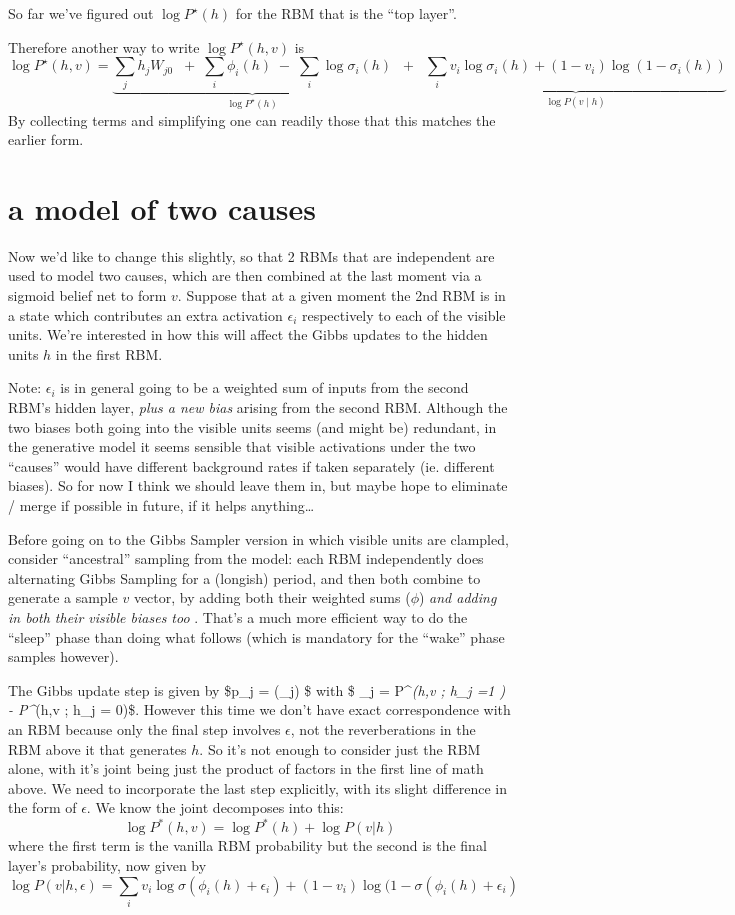 \documentclass{article}
\begin{document}
    So far we've figured out \(\log P^\star(h)\) for the RBM that is the
``top layer''.

Therefore another way to write \(\log P^\star(h,v)\) is \[ 
\log P^\star(h,v) = \underbrace{\sum_j h_j  W_{j0} \;\; + \; \sum_i \phi_i(h) \;  - \; \sum_i \log \sigma_i(h)}_{\log P^\star(h)} \;\;+\;\; \underbrace{\sum_i v_i \log \sigma_i(h) + (1-v_i) \log (1 - \sigma_i(h))}_{\log P(v \mid h)} 
\] By collecting terms and simplifying one can readily those that this
matches the earlier form.

    \section{a model of two causes}\label{a-model-of-two-causes}

Now we'd like to change this slightly, so that 2 RBMs that are
independent are used to model two causes, which are then combined at the
last moment via a sigmoid belief net to form \(v\). Suppose that at a
given moment the 2nd RBM is in a state which contributes an extra
activation \(\epsilon_i\) respectively to each of the visible units.
We're interested in how this will affect the Gibbs updates to the hidden
units \(h\) in the first RBM.

Note: \(\epsilon_i\) is in general going to be a weighted sum of inputs
from the second RBM's hidden layer, \emph{plus a new bias} arising from
the second RBM. Although the two biases both going into the visible
units seems (and might be) redundant, in the generative model it seems
sensible that visible activations under the two ``causes'' would have
different background rates if taken separately (ie. different biases).
So for now I think we should leave them in, but maybe hope to eliminate
/ merge if possible in future, if it helps anything\ldots{}

Before going on to the Gibbs Sampler version in which visible units are
clampled, consider ``ancestral'' sampling from the model: each RBM
independently does alternating Gibbs Sampling for a (longish) period,
and then both combine to generate a sample \(v\) vector, by adding both
their weighted sums (\(\phi\)) \emph{and adding in both their visible
biases too} . That's a much more efficient way to do the ``sleep'' phase
than doing what follows (which is mandatory for the ``wake'' phase
samples however).

    The Gibbs update step is given by \$p\_j = \sigma(\phi\_j) \$ with \$
\psi\_j = \log P\^{}\emph{(h,v ; h\_j =1 ) - \log P\^{}}(h,v ; h\_j =
0)\$. However this time we don't have exact correspondence with an RBM
because only the final step involves \(\epsilon\), not the
reverberations in the RBM above it that generates \(h\). So it's not
enough to consider just the RBM alone, with it's joint being just the
product of factors in the first line of math above. We need to
incorporate the last step explicitly, with its slight difference in the
form of \(\epsilon\). We know the joint decomposes into this:
\[ \log P^* (h,v) = \log P^*(h) + \log P(v|h)\] where the first term is
the vanilla RBM probability but the second is the final layer's
probability, now given by
\[ \log P(v|h,\epsilon) = \sum_i v_i \log \sigma (\phi_i(h) + \epsilon_i) + (1-v_i) \log (1 - \sigma(\phi_i(h) + \epsilon_i)\]
\end{document}

